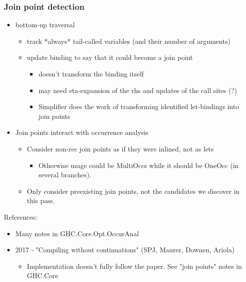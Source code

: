 \documentclass[aspectratio=169]{beamer}
\begin{document}
\begin{frame}
  \frametitle{Join point detection}

  \begin{itemize}
    \item bottom-up traversal
      \begin{itemize}
        \item track *always* tail-called variables (and their number of arguments)
        \item update binding to say that it could become a join point
          \begin{itemize}
            \item doesn't transform the binding itself
            \item may need eta-expansion of the rhs and updates of the call
              sites (?)
            \item Simplifier does the work of transforming identified
              let-bindings into join points
          \end{itemize}
      \end{itemize}
    \item Join points interact with occurrence analysis
      \begin{itemize}
        \item Consider non-rec join points as if they were inlined, not as lets
          \begin{itemize}
            \item Otherwise usage could be MultiOccs while it should be OneOcc (in
              several branches).
          \end{itemize}
          \item Only consider preexisting join points, not the candidates we
            discover in this pass.
      \end{itemize}
  \end{itemize}

  References:
  \begin{itemize}
    \item Many notes in GHC.Core.Opt.OccurAnal
    \item 2017 - "Compiling without continuations" (SPJ, Maurer, Downen, Ariola)
      \begin{itemize}
        \item Implementation doesn't fully follow the paper. See "join points"
          notes in GHC.Core 
      \end{itemize}
  \end{itemize}
\end{frame}
\end{document}

